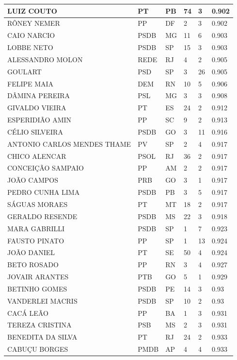 \begin{apendicesenv}
\begin{longtable}{|L{4cm}|C{2cm}|C{1cm}|C{2cm}|C{1cm}|C{2cm}|}
LUIZ COUTO & PT & PB & 74 & 3 & 0.902 \\ \hline
RÔNEY NEMER & PP & DF & 2 & 3 & 0.902 \\ \hline
CAIO NARCIO & PSDB & MG & 11 & 6 & 0.903 \\ \hline
LOBBE NETO & PSDB & SP & 15 & 3 & 0.903 \\ \hline
ALESSANDRO MOLON & REDE & RJ & 4 & 2 & 0.905 \\ \hline
GOULART & PSD & SP & 3 & 26 & 0.905 \\ \hline
FELIPE MAIA & DEM & RN & 10 & 5 & 0.906 \\ \hline
DÂMINA PEREIRA & PSL & MG & 3 & 3 & 0.908 \\ \hline
GIVALDO VIEIRA & PT & ES & 24 & 2 & 0.912 \\ \hline
ESPERIDIÃO AMIN & PP & SC & 9 & 2 & 0.913 \\ \hline
CÉLIO SILVEIRA & PSDB & GO & 3 & 11 & 0.916 \\ \hline
ANTONIO CARLOS MENDES THAME & PV & SP & 2 & 4 & 0.917 \\ \hline
CHICO ALENCAR & PSOL & RJ & 36 & 2 & 0.917 \\ \hline
CONCEIÇÃO SAMPAIO & PP & AM & 2 & 2 & 0.917 \\ \hline
JOÃO CAMPOS & PRB & GO & 3 & 1 & 0.917 \\ \hline
PEDRO CUNHA LIMA & PSDB & PB & 3 & 5 & 0.917 \\ \hline
SÁGUAS MORAES & PT & MT & 18 & 2 & 0.917 \\ \hline
GERALDO RESENDE & PSDB & MS & 22 & 3 & 0.918 \\ \hline
MARA GABRILLI & PSDB & SP & 1 & 7 & 0.923 \\ \hline
FAUSTO PINATO & PP & SP & 1 & 13 & 0.924 \\ \hline
JOÃO DANIEL & PT & SE & 50 & 4 & 0.924 \\ \hline
BETO ROSADO & PP & RN & 3 & 4 & 0.927 \\ \hline
JOVAIR ARANTES & PTB & GO & 5 & 1 & 0.929 \\ \hline
BETINHO GOMES & PSDB & PE & 14 & 3 & 0.93 \\ \hline
VANDERLEI MACRIS & PSDB & SP & 10 & 2 & 0.93 \\ \hline
CACÁ LEÃO & PP & BA & 1 & 3 & 0.931 \\ \hline
TEREZA CRISTINA & PSB & MS & 2 & 3 & 0.931 \\ \hline
BENEDITA DA SILVA & PT & RJ & 24 & 2 & 0.933 \\ \hline
CABUÇU BORGES & PMDB & AP & 4 & 4 & 0.933 \\ \hline

\end{longtable}
\end{apendicesenv}
